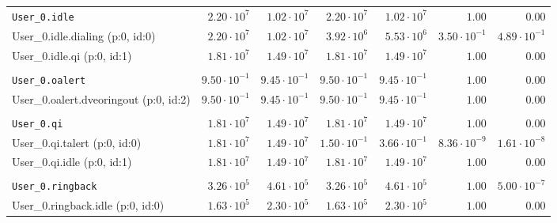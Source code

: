 \begin{table}[htbp]
{\begin{tabular}{lrrrrrr}
\\[-8pt]\texttt{User\_0.idle}                        &  $2.20 \cdot 10^{7}$ &  $1.02 \cdot 10^{7}$ &  $2.20 \cdot 10^{7}$ &  $1.02 \cdot 10^{7}$ &               $1.00$ &               $0.00$ \\
\hspace{3mm}User\_0.idle.dialing (p:0, id:0)         &  $2.20 \cdot 10^{7}$ &  $1.02 \cdot 10^{7}$ &  $3.92 \cdot 10^{6}$ &  $5.53 \cdot 10^{6}$ & $3.50 \cdot 10^{-1}$ & $4.89 \cdot 10^{-1}$ \\
\hspace{3mm}User\_0.idle.qi (p:0, id:1)              &  $1.81 \cdot 10^{7}$ &  $1.49 \cdot 10^{7}$ &  $1.81 \cdot 10^{7}$ &  $1.49 \cdot 10^{7}$ &               $1.00$ &               $0.00$ \\
\\[-8pt]\texttt{User\_0.oalert}                      & $9.50 \cdot 10^{-1}$ & $9.45 \cdot 10^{-1}$ & $9.50 \cdot 10^{-1}$ & $9.45 \cdot 10^{-1}$ &               $1.00$ &               $0.00$ \\
\hspace{3mm}User\_0.oalert.dveoringout (p:0, id:2)   & $9.50 \cdot 10^{-1}$ & $9.45 \cdot 10^{-1}$ & $9.50 \cdot 10^{-1}$ & $9.45 \cdot 10^{-1}$ &               $1.00$ &               $0.00$ \\
\\[-8pt]\texttt{User\_0.qi}                          &  $1.81 \cdot 10^{7}$ &  $1.49 \cdot 10^{7}$ &  $1.81 \cdot 10^{7}$ &  $1.49 \cdot 10^{7}$ &               $1.00$ &               $0.00$ \\
\hspace{3mm}User\_0.qi.talert (p:0, id:0)            &  $1.81 \cdot 10^{7}$ &  $1.49 \cdot 10^{7}$ & $1.50 \cdot 10^{-1}$ & $3.66 \cdot 10^{-1}$ & $8.36 \cdot 10^{-9}$ & $1.61 \cdot 10^{-8}$ \\
\hspace{3mm}User\_0.qi.idle (p:0, id:1)              &  $1.81 \cdot 10^{7}$ &  $1.49 \cdot 10^{7}$ &  $1.81 \cdot 10^{7}$ &  $1.49 \cdot 10^{7}$ &               $1.00$ &               $0.00$ \\
\\[-8pt]\texttt{User\_0.ringback}                    &  $3.26 \cdot 10^{5}$ &  $4.61 \cdot 10^{5}$ &  $3.26 \cdot 10^{5}$ &  $4.61 \cdot 10^{5}$ &               $1.00$ & $5.00 \cdot 10^{-7}$ \\
\hspace{3mm}User\_0.ringback.idle (p:0, id:0)        &  $1.63 \cdot 10^{5}$ &  $2.30 \cdot 10^{5}$ &  $1.63 \cdot 10^{5}$ &  $2.30 \cdot 10^{5}$ &               $1.00$ &               $0.00$ \\

\end{tabular}}
\end{table}
